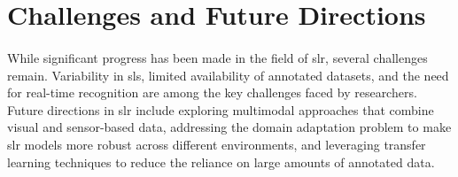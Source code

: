\section{Challenges and Future Directions}
\paragraph{}
While significant progress has been made in the field of \ac{slr}, several challenges remain. Variability in \ac{sl}s, limited availability of annotated datasets, and the need for real-time recognition are among the key challenges faced by researchers. Future directions in \ac{slr} include exploring multimodal approaches that combine visual and sensor-based data, addressing the domain adaptation problem to make \ac{slr} models more robust across different environments, and leveraging transfer learning techniques to reduce the reliance on large amounts of annotated data.